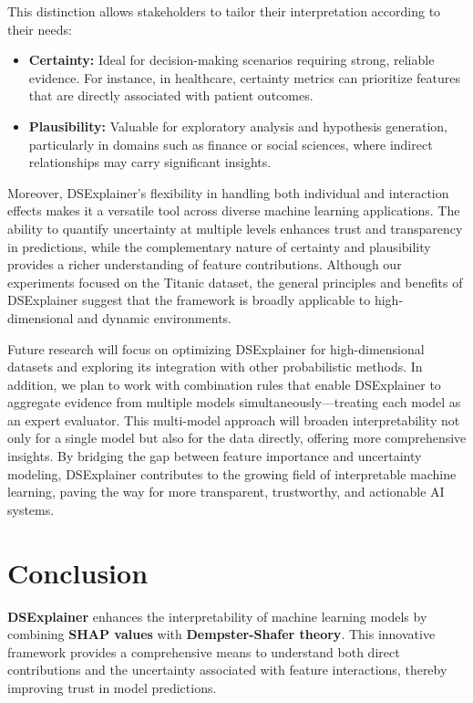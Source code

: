 \documentclass[acmlarge]{acmart}
\begin{document}
This distinction allows stakeholders to tailor their interpretation according to their needs:
\begin{itemize}
    \item \textbf{Certainty:} Ideal for decision-making scenarios requiring strong, reliable evidence. For instance, in healthcare, certainty metrics can prioritize features that are directly associated with patient outcomes.
    \item \textbf{Plausibility:} Valuable for exploratory analysis and hypothesis generation, particularly in domains such as finance or social sciences, where indirect relationships may carry significant insights.
\end{itemize}

Moreover, DSExplainer’s flexibility in handling both individual and interaction effects makes it a versatile tool across diverse machine learning applications. The ability to quantify uncertainty at multiple levels enhances trust and transparency in predictions, while the complementary nature of certainty and plausibility provides a richer understanding of feature contributions. Although our experiments focused on the Titanic dataset, the general principles and benefits of DSExplainer suggest that the framework is broadly applicable to high-dimensional and dynamic environments.

Future research will focus on optimizing DSExplainer for high-dimensional datasets and exploring its integration with other probabilistic methods. In addition, we plan to work with combination rules that enable DSExplainer to aggregate evidence from multiple models simultaneously—treating each model as an expert evaluator. This multi-model approach will broaden interpretability not only for a single model but also for the data directly, offering more comprehensive insights. By bridging the gap between feature importance and uncertainty modeling, DSExplainer contributes to the growing field of interpretable machine learning, paving the way for more transparent, trustworthy, and actionable AI systems.

\section{Conclusion}
\label{sec:conclusion}

\textbf{DSExplainer} enhances the interpretability of machine learning models by combining \textbf{SHAP values} with \textbf{Dempster-Shafer theory}. This innovative framework provides a comprehensive means to understand both direct contributions and the uncertainty associated with feature interactions, thereby improving trust in model predictions.
\end{document}
